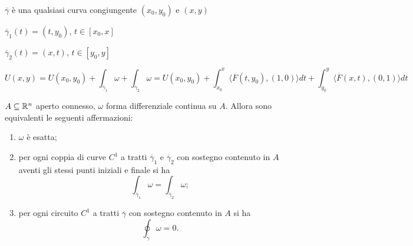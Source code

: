 {\color{red} $\overline{\gamma}$ è una qualsiasi curva congiungente $(x_0,y_0)$ e $(x,y)$}

$\overline{\gamma}_1(t)=(t,y_0)$, $t \in [x_0,x]$

$\overline{\gamma}_2(t)=(x,t)$, $t \in [y_0,y]$

$$U(x,y)=U(x_0,y_0)+\int_{\overline{\gamma}_1}\omega + \int_{\overline{\gamma}_2}\omega= U(x_0,y_0)+\int_{x_0}^x\langle \overline{F}(t,y_0),(1,0) \rangle dt + \int_{y_0}^y \langle \overline{F}(x,t),(0,1)\rangle dt$$


\begin{theorem}

	\label{th: pag 478}
	$A \subseteq \mathbb{R}^n$ aperto connesso, $\omega$ forma differenziale continua su $A$. Allora sono equivalenti le seguenti affermazioni:
	\begin{enumerate}
		\item $\omega$ è esatta;
		\item per ogni coppia di curve $C^1$ a tratti $\overline{\gamma}_1$ e $\overline{\gamma}_2$ con sostegno contenuto in $A$ aventi gli stessi punti iniziali e finale si ha
		\begin{equation*}
			\int_{\overline{\gamma}_1}\omega=\int_{\overline{\gamma}_2}\omega;
		\end{equation*}
		\item per ogni circuito $C^1$ a tratti $\overline{\gamma}$ con sostegno contenuto in $A$ si ha
		\begin{equation*}
			\oint_{\overline{\gamma}}\omega=0.
		\end{equation*}
	\end{enumerate}
\end{theorem}


